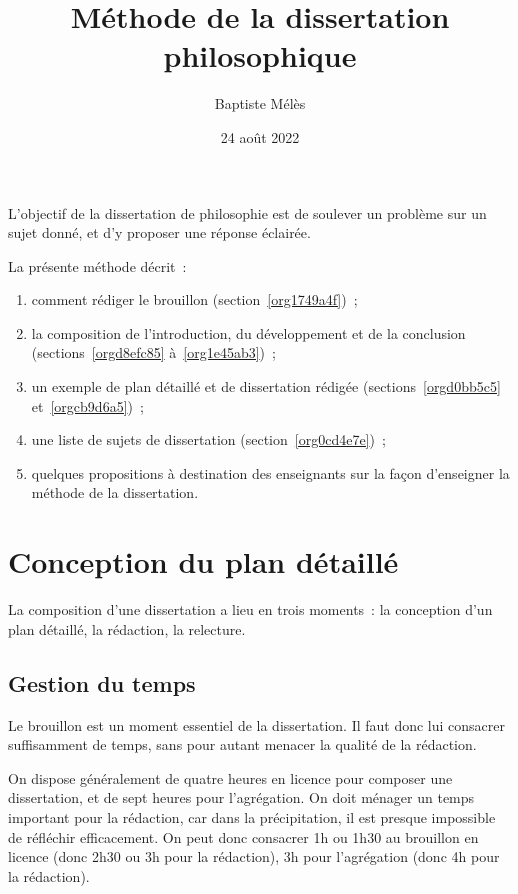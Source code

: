 \documentclass[a4paper,12pt]{article}
\author{Baptiste Mélès}
\date{24 août 2022}
\title{Méthode de la dissertation philosophique}
\begin{document}
\maketitle
\setcounter{tocdepth}{3}
\tableofcontents

\bigskip

L'objectif de la dissertation de philosophie est de soulever un problème
sur un sujet donné, et d'y proposer une réponse éclairée.

La présente méthode décrit : 
\begin{enumerate}
\item comment rédiger le brouillon (section \ref{org1749a4f}) ;
\item la composition de l'introduction, du développement et de la conclusion
(sections \ref{orgd8efc85} à \ref{org1e45ab3}) ;
\item un exemple de plan détaillé et de dissertation rédigée
(sections \ref{orgd0bb5c5} et \ref{orgcb9d6a5}) ;
\item une liste de sujets de dissertation (section \ref{org0cd4e7e}) ;
\item quelques propositions à destination des enseignants sur la façon
d'enseigner la méthode de la dissertation.
\end{enumerate}

\section{Conception du plan détaillé}
\label{sec:orge6df276}
\label{org1749a4f}

La composition d'une dissertation a lieu en trois moments : la
conception d'un plan détaillé, la rédaction, la relecture.

\subsection{Gestion du temps}
\label{sec:orge2055a5}

Le brouillon est un moment essentiel de la dissertation. Il faut donc
lui consacrer suffisamment de temps, sans pour autant menacer la qualité
de la rédaction.

On dispose généralement de quatre heures en licence pour composer une
dissertation, et de sept heures pour l'agrégation. On doit ménager un
temps important pour la rédaction, car dans la précipitation, il est
presque impossible de réfléchir efficacement. On peut donc consacrer 1h
ou 1h30 au brouillon en licence (donc 2h30 ou 3h pour la rédaction), 3h
pour l'agrégation (donc 4h pour la rédaction).
\end{document}
